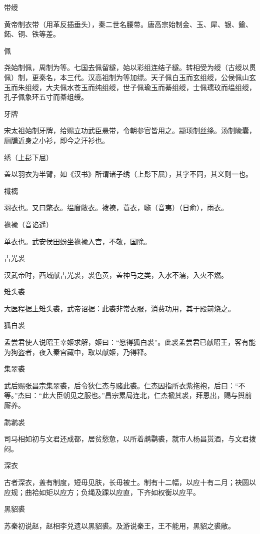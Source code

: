 \documentclass[a4paper,12pt,UTF8,twoside]{ctexbook}
\begin{document}
    带绶
    
    黄帝制衣带（用革反插垂头），秦二世名腰带。唐高宗始制金、玉、犀、银、鍮、鉐、铜、铁等差。
    
    佩
    
    尧始制佩，周制为等。七国去佩留繸，始以彩组连结子繸。转相受为绶（古绶以贯佩）制，更秦名，本三代。汉高祖制为等加缥。天子佩白玉而玄组绶，公侯佩山玄玉而朱组绶，大夫佩水苍玉而纯组绶，世子佩瑜玉而綦组绶，士佩瓀玟而缊组绶，孔子佩象环五寸而綦组绶。
    
    牙牌
    
    宋太祖始制牙牌，给赐立功武臣悬带，令朝参官皆用之。颛顼制丝绦。汤制隃囊，厕牖近身之小衫，即今之汗衫也。
    
    绣（上髟下屈）
    
    盖以羽衣为半臂，如《汉书》所谓诸子绣（上髟下屈），其字不同，其义则一也。
    
    襳褵
    
    羽衣也。又曰氅衣。缊黂敝衣。袯襫，蓑衣，暆（音夷）（日俞），雨衣。
    
    襜褕（音谄遥）
    
    单衣也。武安侯田蚡坐襜褕入宫，不敬，国除。
    
    吉光裘
    
    汉武帝时，西域献吉光裘，裘色黄，盖神马之类，入水不濡，入火不燃。
    
    雉头裘
    
    大医程据上雉头裘，武帝诏据：此裘非常衣服，消费功用，其于殿前烧之。
    
    狐白裘
    
    孟尝君使人说昭王幸姬求解，姬曰：“愿得狐白裘”。此裘孟尝君已献昭王，客有能为狗盗者，夜入秦宫藏中，取以献姬，乃得释。
    
    集翠裘
    
    武后赐张昌宗集翠裘，后令狄仁杰与赌此裘。仁杰因指所衣紫拖袍，后曰：“不等。”杰曰：“此大臣朝见之服也。”昌宗累局连北，仁杰褫其裘，拜恩出，赐与舆前厮养。
    
    鹔鹴裘
    
    司马相如初与文君还成都，居贫愁惫，以所着鹔鹴裘，就市人杨昌贳酒，与文君拨闷。
    
    深衣
    
    古者深衣，盖有制度，短毋见肤，长毋被土。制有十二幅，以应十有二月；袂圆以应规；曲袷如矩以应方；负绳及踝以应直，下齐如权衡以应平。
    
    黑貂裘
    
    苏秦初说赵，赵相李兑遗以黑貂裘。及游说秦王，王不能用，黑貂之裘敝。
    
\end{document}
